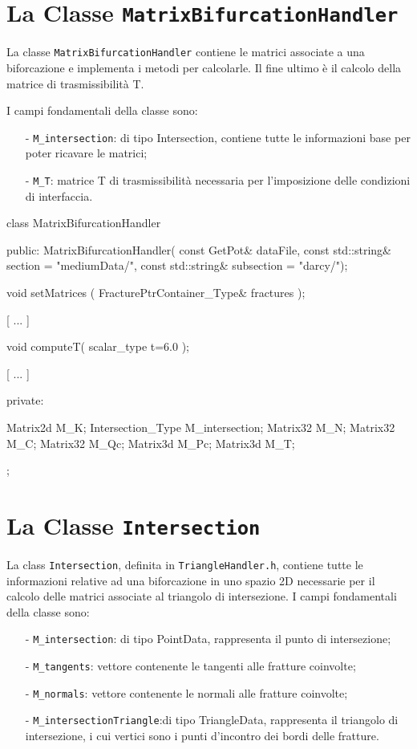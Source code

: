 \section{La Classe \texttt{MatrixBifurcationHandler}}
La classe \texttt{MatrixBifurcationHandler} contiene le matrici associate a una biforcazione e implementa i metodi per calcolarle.  Il fine ultimo è il calcolo della matrice di trasmissibilità T.

\noindent I campi fondamentali della classe sono:
	\begin{enumerate}
	\item[-] \texttt{M\_intersection}: di tipo Intersection, contiene tutte le informazioni base per poter ricavare le matrici;
	\item[-] \texttt{M\_T}: matrice T di trasmissibilità necessaria per l'imposizione delle condizioni di interfaccia.
	\end{enumerate} 
\begin{Code03_03}[caption={Classe \texttt{Intersection}}]
class MatrixBifurcationHandler
{
 public:
	MatrixBifurcationHandler( const GetPot& dataFile,
				const std::string& section = "mediumData/",
				const std::string& subsection = "darcy/");
	
	void setMatrices ( FracturePtrContainer_Type& fractures );
	
	[ ... ]
	
	void computeT( scalar_type t=6.0 );

	[ ... ]

 private:

	Matrix2d M_K;
	Intersection_Type M_intersection;
	Matrix32 M_N;
	Matrix32 M_C;
	Matrix32 M_Qc;
	Matrix3d M_Pc;
	Matrix3d M_T;
};
\end{Code03_03}

\section{La Classe \texttt{Intersection}}

La class \texttt{Intersection}, definita in \texttt{TriangleHandler.h}, contiene tutte le informazioni relative ad una biforcazione in uno spazio 2D necessarie per il calcolo delle matrici associate al triangolo di intersezione.
I campi fondamentali della classe sono:
	\begin{enumerate}
	\item[-] \texttt{M\_intersection}: di tipo PointData, rappresenta il punto di intersezione;
	\item[-] \texttt{M\_tangents}: vettore contenente le tangenti alle fratture coinvolte;
	\item[-] \texttt{M\_normals}: vettore contenente le normali alle fratture coinvolte;
	\item[-] \texttt{M\_intersectionTriangle}:di tipo TriangleData, rappresenta il triangolo di intersezione, i cui vertici sono i punti d'incontro dei bordi delle fratture.
	\end{enumerate} 

